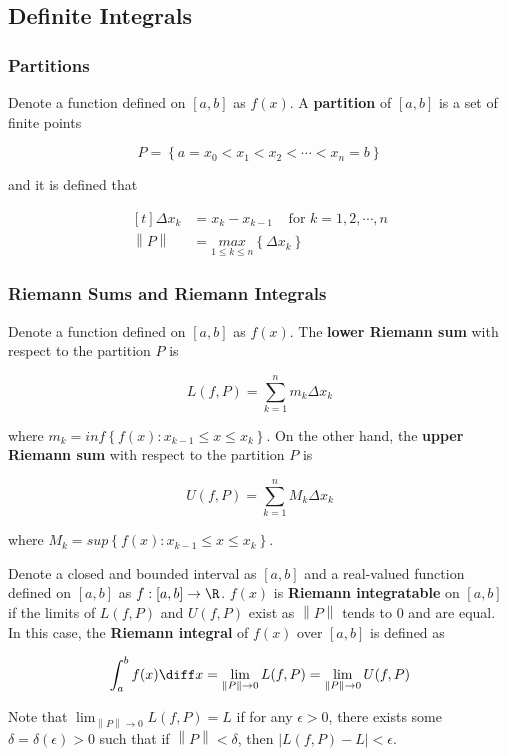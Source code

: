 \subsection{Definite Integrals}
\subsubsection{Partitions}
\begin{dft}
  Denote a function defined on $[a,b]$ as $f(x)$. A \textbf{partition} of $[a,b]$ is a set of finite points

  $$P=\left\{ a=x_{0}<x_{1}<x_{2}<\cdots<x_{n}=b\right\}$$

  and it is defined that

  $$\begin{aligned}[t]
    \Delta x_{k}&=x_{k}-x_{k-1}\;\;\;\;\text{for }k=1,2,\cdots,n\\
    \left\| P\right\| &=\underset{1\leq k\leq n}{max}\left\{ \Delta x_{k}\right\}
  \end{aligned}$$
\end{dft}

\subsubsection{Riemann Sums and Riemann Integrals}
\begin{dft}
  Denote a function defined on $[a,b]$ as $f(x)$. The \textbf{lower Riemann sum} with respect to the partition $P$ is

  $$L(f,P)=\sum_{k=1}^{n}m_{k}\Delta x_{k}$$\s

  where $m_{k}=inf\left\{ f(x):x_{k-1}\leq x\leq x_{k}\right\}$. On the other hand, the \textbf{upper Riemann sum} with respect to the partition $P$ is

  $$U(f,P)=\sum_{k=1}^{n}M_{k}\Delta x_{k}$$\s

  where $M_{k}=sup\left\{ f(x):x_{k-1}\leq x\leq x_{k}\right\}$.\n
\end{dft}

\begin{dft}
  Denote a closed and bounded interval as $[a,b]$ and a real-valued function defined on $[a,b]$ as $f: [a,b]\to\R$. $f(x)$ is \textbf{Riemann integratable} on $[a,b]$ if the limits of $L(f,P)$ and $U(f,P)$ exist as $\left\| P\right\|$ tends to $0$ and are equal. In this case, the \textbf{Riemann integral} of $f(x)$ over $[a,b]$ is defined as

  $$\int_{a}^{b}f(x)\diff x=\lim_{\left\| P\right\| \to 0}L(f,P)=\lim_{\left\| P\right\| \to 0}U(f,P)$$\s

  Note that $\lim_{\left\| P\right\| \to 0}L(f,P)=L$ if for any $\epsilon>0$, there exists some $\delta=\delta(\epsilon)>0$ such that if $\left\| P\right\| <\delta$, then $\left| L(f,P)-L \right| <\epsilon$.
\end{dft}


